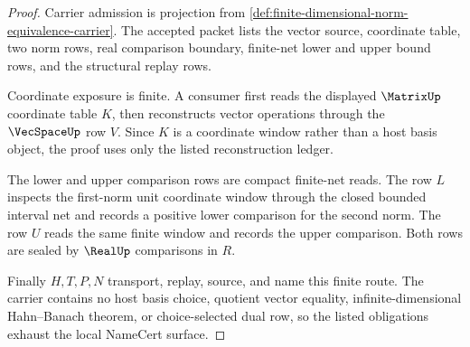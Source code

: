 \begin{proof}
Carrier admission is projection from \autoref{def:finite-dimensional-norm-equivalence-carrier}. The accepted packet lists the vector source, coordinate table, two norm rows, real comparison boundary, finite-net lower and upper bound rows, and the structural replay rows.

Coordinate exposure is finite. A consumer first reads the displayed $\MatrixUp$ coordinate table $K$, then reconstructs vector operations through the $\VecSpaceUp$ row $V$. Since $K$ is a coordinate window rather than a host basis object, the proof uses only the listed reconstruction ledger.

The lower and upper comparison rows are compact finite-net reads. The row $L$ inspects the first-norm unit coordinate window through the closed bounded interval net and records a positive lower comparison for the second norm. The row $U$ reads the same finite window and records the upper comparison. Both rows are sealed by $\RealUp$ comparisons in $R$.

Finally $H,T,P,N$ transport, replay, source, and name this finite route. The carrier contains no host basis choice, quotient vector equality, infinite-dimensional Hahn--Banach theorem, or choice-selected dual row, so the listed obligations exhaust the local NameCert surface.
\end{proof}

